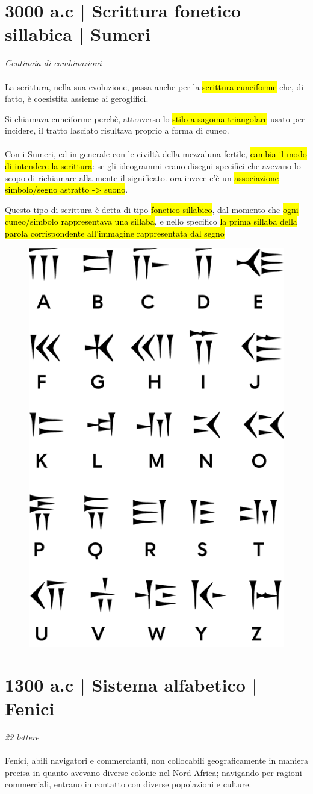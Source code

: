 \section{3000 a.c | Scrittura fonetico sillabica | Sumeri}
{\huge \textit{Centinaia di combinazioni}}\\\\
La scrittura, nella sua evoluzione, passa anche per la \hl{scrittura cuneiforme} che, di fatto, è coesistita assieme ai geroglifici. 

Si chiamava cuneiforme perchè, attraverso lo \hl{stilo a sagoma triangolare} usato per incidere, il tratto lasciato risultava proprio a forma di cuneo. 
\\\\
Con i Sumeri, ed in generale con le civiltà della mezzaluna fertile, \hl{cambia il modo di intendere la scrittura}: se gli  ideogrammi erano disegni specifici che avevano lo scopo di richiamare alla mente il significato. ora invece c'è un \hl{associazione simbolo/segno astratto -> suono}.

Questo tipo di scrittura è detta di tipo \hl{fonetico sillabico}, dal momento che \hl{ ogni cuneo/simbolo rappresentava una sillaba}, e nello specifico \hl{la prima sillaba della parola corrispondente all'immagine rappresentata dal segno}

\begin{figure}[H]
    \centering
    \includegraphics[width=0.3\linewidth]{lezione_3/imgs/tabellaok.png}
\end{figure}

\section{1300 a.c | Sistema alfabetico | Fenici}
{\huge \textit{22 lettere}}\\\\
Fenici, abili navigatori e commercianti, non collocabili geograficamente in maniera precisa in quanto avevano diverse colonie nel Nord-Africa; navigando per ragioni commerciali, entrano in contatto con diverse popolazioni e culture. 

